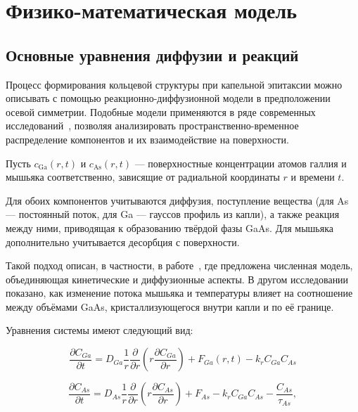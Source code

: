 \documentclass[14pt,oneside]{extarticle}
\begin{document}
\pagebreak

\section{Физико-математическая модель}

\subsection{Основные уравнения диффузии и реакций}

Процесс формирования кольцевой структуры при капельной эпитаксии можно описывать с помощью реакционно-диффузионной модели в предположении осевой симметрии. Подобные модели применяются в ряде современных исследований~\cite{reyes2013, bietti2020}, позволяя анализировать пространственно-временное распределение компонентов и их взаимодействие на поверхности.

Пусть $c_{\text{Ga}}(r,t)$ и $c_{\text{As}}(r,t)$ — поверхностные концентрации атомов галлия и мышьяка соответственно, зависящие от радиальной координаты $r$ и времени $t$.

Для обоих компонентов учитываются диффузия, поступление вещества (для As — постоянный поток, для Ga — гауссов профиль из капли), а также реакция между ними, приводящая к образованию твёрдой фазы GaAs. Для мышьяка дополнительно учитывается десорбция с поверхности.

Такой подход описан, в частности, в работе~\cite{reyes2013_1}, где предложена численная модель, объединяющая кинетические и диффузионные аспекты. В другом исследовании~\cite{bietti2020} показано, как изменение потока мышьяка и температуры влияет на соотношение между объёмами GaAs, кристаллизующегося внутри капли и по её границе.

Уравнения системы имеют следующий вид:

\begin{equation}
\frac{\partial C_{Ga}}{\partial t}=D_{Ga}\frac{1}{r}\frac{\partial}{\partial r}\left(r\frac{\partial C_{Ga}}{\partial r}\right)+F_{Ga}\left(r,t\right)-k_{r}C_{Ga}C_{As}
\label{eq:ga_diff}
\end{equation}

\begin{equation}
\frac{\partial C_{As}}{\partial t}=D_{As}\frac{1}{r}\frac{\partial}{\partial r}\left(r\frac{\partial C_{As}}{\partial r}\right)+F_{As}-k_{r}C_{Ga}C_{As}-\frac{C_{As}}{\tau_{As}},
\label{eq:as_diff}
\end{equation}
\end{document}
